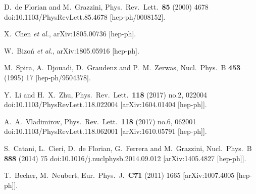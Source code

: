 \documentclass[12pt]{article}
\begin{document}
\begin{thebibliography}{99}
  D.~de Florian and M.~Grazzini,
  Phys.\ Rev.\ Lett.\  {\bf 85} (2000) 4678
  doi:10.1103/PhysRevLett.85.4678
  [hep-ph/0008152].
  
  X.~Chen {\it et al.},
  arXiv:1805.00736 [hep-ph].

  W.~Bizoń {\it et al.},
  arXiv:1805.05916 [hep-ph].

  

  M.~Spira, A.~Djouadi, D.~Graudenz and P.~M.~Zerwas,
  Nucl.\ Phys.\ B {\bf 453} (1995) 17
  [hep-ph/9504378].

  Y.~Li and H.~X.~Zhu,
  Phys.\ Rev.\ Lett.\  {\bf 118} (2017) no.2,  022004
  doi:10.1103/PhysRevLett.118.022004
  [arXiv:1604.01404 [hep-ph]].
  
  A.~A.~Vladimirov,
  Phys.\ Rev.\ Lett.\  {\bf 118} (2017) no.6,  062001
  doi:10.1103/PhysRevLett.118.062001
  [arXiv:1610.05791 [hep-ph]].
  
  S.~Catani, L.~Cieri, D.~de Florian, G.~Ferrera and M.~Grazzini,
  Nucl.\ Phys.\ B {\bf 888} (2014) 75
  doi:10.1016/j.nuclphysb.2014.09.012
  [arXiv:1405.4827 [hep-ph]].
  

  T.~Becher, M.~Neubert,
  Eur.\ Phys.\ J.\  {\bf C71 } (2011)  1665
[arXiv:1007.4005 [hep-ph]].



\end{thebibliography}
\end{document}
